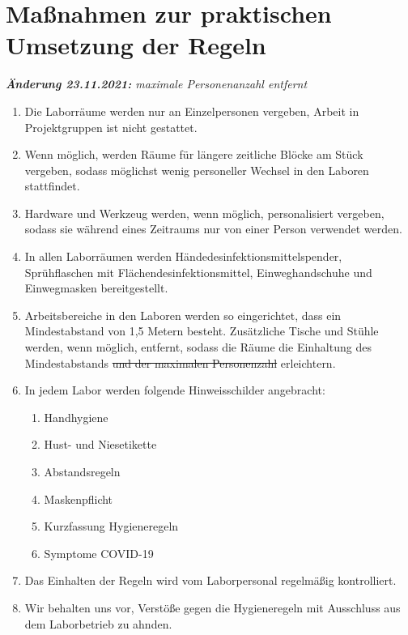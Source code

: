 \section{Maßnahmen zur praktischen Umsetzung der Regeln}\label{sec:umsetzung}

\noindent
\emph{\textbf{Änderung 23.11.2021:} maximale Personenanzahl entfernt}
\medskip

\begin{enumerate}
    \item Die Laborräume werden nur an Einzelpersonen vergeben, Arbeit in Projektgruppen ist nicht gestattet.
    \item Wenn möglich, werden Räume für längere zeitliche Blöcke am Stück vergeben, sodass möglichst wenig personeller Wechsel in den Laboren stattfindet.
    \item Hardware und Werkzeug werden, wenn möglich, personalisiert vergeben, sodass sie während eines Zeitraums nur von einer Person verwendet werden.
    \item In allen Laborräumen werden Händedesinfektionsmittelspender, Sprühflaschen mit Flächendesinfektionsmittel, Einweghandschuhe und Einwegmasken bereitgestellt. 
    \item Arbeitsbereiche in den Laboren werden so eingerichtet, dass ein Mindestabstand von 1,5 Metern besteht. Zusätzliche Tische und Stühle werden, wenn möglich, entfernt, sodass die Räume die Einhaltung des Mindestabstands \sout{und der maximalen Personenzahl} erleichtern.
    \item In jedem Labor werden folgende Hinweisschilder angebracht:
    \begin{enumerate}
        \item Handhygiene
        \item Hust- und Niesetikette
        \item Abstandsregeln
        \item Maskenpflicht
        \item Kurzfassung Hygieneregeln
        \item Symptome COVID-19
    \end{enumerate}
    \item Das Einhalten der Regeln wird vom Laborpersonal regelmäßig kontrolliert.
    \item Wir behalten uns vor, Verstöße gegen die Hygieneregeln mit Ausschluss aus dem Laborbetrieb zu ahnden.
\end{enumerate}
